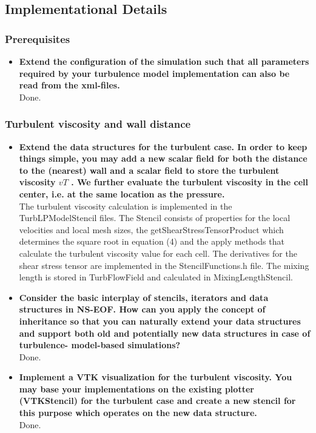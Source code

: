 \documentclass[a4paper]{article}
\begin{document}
\subsection{Implementational Details}
\subsubsection{Prerequisites}
	\begin{itemize}
	\item \textbf{Extend the configuration of the simulation such that all parameters required by your turbulence model implementation can also be read from the xml-files.}\\
	Done.
\end{itemize}
\subsubsection{Turbulent viscosity and wall distance}
\begin{itemize}
	\item \textbf{Extend the data structures for the turbulent case. In order to keep things simple, you may add a new scalar field for both the distance to the (nearest) wall and a scalar field to store the turbulent viscosity $vT$ . We further evaluate the turbulent viscosity in the cell center, i.e. at the same location as the pressure.}\\
	The turbulent viscosity calculation is implemented in the TurbLPModelStencil files. The Stencil consists of properties for the local velocities and local mesh sizes, the getShearStressTensorProduct which determines the square root in equation (4) and the apply methods that calculate the  turbulent viscosity value for each cell. The derivatives for the shear stress tensor are implemented in the StencilFunctions.h file. The mixing length is stored in TurbFlowField and calculated in MixingLengthStencil. 
	\item \textbf{Consider the basic interplay of stencils, iterators and data structures in NS-EOF. How can you apply the concept of inheritance so that you can naturally extend your data structures and support both old and potentially new data structures in case of turbulence- model-based simulations?}\\
	Done.
	\item \textbf{Implement a VTK visualization for the turbulent viscosity. You may base your implementations on the existing plotter (VTKStencil) for the turbulent case and create a new stencil for this purpose which operates on the new data structure.}\\
	Done.
\end{itemize}
\end{document}
